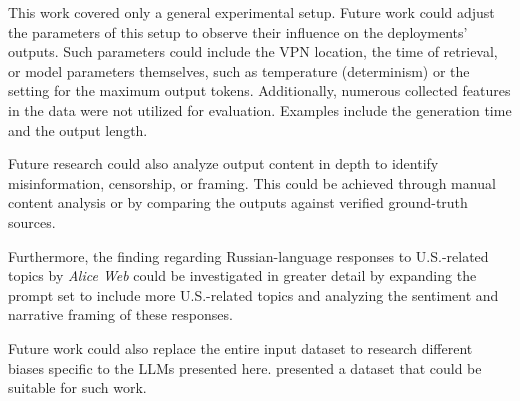 This work covered only a general experimental setup. Future work could adjust the parameters of this setup to observe their influence on the deployments' outputs. Such parameters could include the VPN location, the time of retrieval, or model parameters themselves, such as temperature (determinism) or the setting for the maximum output tokens. Additionally, numerous collected features in the data were not utilized for evaluation. Examples include the generation time and the output length.

Future research could also analyze output content in depth to identify misinformation, censorship, or framing. This could be achieved through manual content analysis or by comparing the outputs against verified ground-truth sources.

Furthermore, the finding regarding Russian-language responses to U.S.-related topics by \textit{Alice Web} could be investigated in greater detail by expanding the prompt set to include more U.S.-related topics and analyzing the sentiment and narrative framing of these responses.

Future work could also replace the entire input dataset to research different biases specific to the LLMs presented here. \citeauthor{grigorevaRuBiaRussianLanguage2024} presented a dataset that could be suitable for such work.
